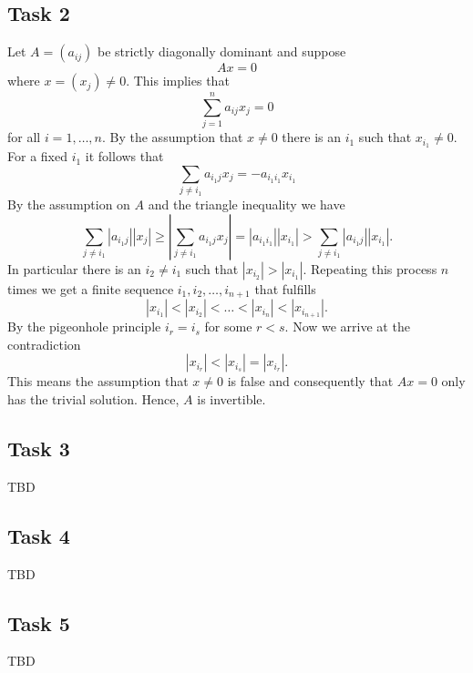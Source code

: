\documentclass[a4paper,12pt]{article}
\begin{document}
\subsection*{Task 2}

Let \(A = (a_{ij})\) be strictly diagonally dominant and suppose
\[ Ax = 0 \]
where \(x = (x_j) \ne 0\).
This implies that
\[ \sum_{j=1}^n a_{ij} x_j = 0 \]
for all \(i = 1, \dots, n\).
By the assumption that \(x \ne 0\) there is an \(i_1\) such that
\(x_{i_1} \ne 0\).
For a fixed \(i_1\) it follows that
\[ \sum_{j \ne i_1} a_{i_1j} x_j = -a_{i_1i_1}x_{i_1} \]
By the assumption on \(A\) and the triangle inequality we have
\[
  \sum_{j \ne i_1} |a_{i_1j}| |x_j|
    \ge \left| \sum_{j \ne i_1} a_{i_1j} x_j \right|
    = |a_{i_1i_1}| |x_{i_1}|
    > \sum_{j \ne i_1} |a_{i_1j}| |x_{i_1}|.
\]
In particular there is an \(i_2 \ne i_1\) such that \(|x_{i_2}| > |x_{i_1}|\).
Repeating this process \(n\) times we get a finite sequence
\(i_1, i_2, \dots, i_{n+1}\) that fulfills
\[ |x_{i_1}| < |x_{i_2}| < \dots < |x_{i_n}| < |x_{i_{n+1}}|. \]
By the pigeonhole principle \(i_r = i_s\) for some \(r < s\).
Now we arrive at the contradiction
\[ |x_{i_r}| < |x_{i_s}| = |x_{i_r}|. \]
This means the assumption that \(x \ne 0\) is false and consequently that
\(Ax = 0\) only has the trivial solution.
Hence, \(A\) is invertible.


\subsection*{Task 3}

TBD


\subsection*{Task 4}

TBD


\subsection*{Task 5}

TBD
\end{document}
